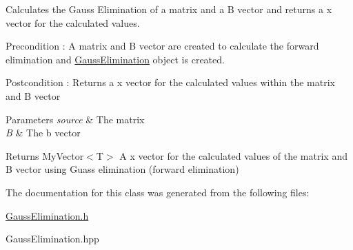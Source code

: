 Calculates the Gauss Elimination of a matrix and a B vector and returns a x vector for the calculated values. 

\begin{DoxyPrecond}{Precondition}
\+: A matrix and B vector are created to calculate the forward elimination and \mbox{\hyperlink{class_gauss_elimination}{Gauss\+Elimination}} object is created. 
\end{DoxyPrecond}
\begin{DoxyPostcond}{Postcondition}
\+: Returns a x vector for the calculated values within the matrix and B vector 
\end{DoxyPostcond}

\begin{DoxyParams}{Parameters}
{\em source} & The matrix \\
\hline
{\em B} & The b vector \\
\hline
\end{DoxyParams}
\begin{DoxyReturn}{Returns}
My\+Vector$<$\+T$>$ A x vector for the calculated values of the matrix and B vector using Guass elimination (forward elimination) 
\end{DoxyReturn}


The documentation for this class was generated from the following files\+:\begin{DoxyCompactItemize}
\item 
\mbox{\hyperlink{_gauss_elimination_8h}{Gauss\+Elimination.\+h}}\item 
Gauss\+Elimination.\+hpp\end{DoxyCompactItemize}
